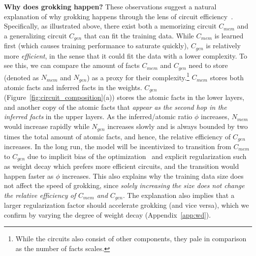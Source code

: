 \noindent\textbf{Why does grokking happen?} These observations suggest a natural explanation of why grokking happens through the lens of circuit efficiency~\citep{varma2023explaining}.
Specifically, as illustrated above, there exist both a memorizing circuit $C_{mem}$ and a generalizing circuit $C_{gen}$ that can fit the training data. While $C_{mem}$ is learned first (which causes training performance to saturate quickly), $C_{gen}$ is relatively more \textit{efficient}, in the sense that it could fit the data with a lower complexity.
To see this, we can compare the amount of facts $C_{mem}$ and $C_{gen}$ need to store (denoted as $N_{mem}$ and $N_{gen}$) as a proxy for their complexity.\footnote{While the circuits also consist of other components, they pale in comparison as the number of facts scales.}
$C_{mem}$ stores both atomic facts and inferred facts in the weights. $C_{gen}$ (Figure~\ref{fig:circuit_composition}(a)) stores the atomic facts in the lower layers, and another copy of the atomic facts that \textit{appear as the second hop in the inferred facts} in the upper layers. As the inferred/atomic ratio $\phi$ increases, $N_{mem}$ would increase rapidly while $N_{gen}$ increases slowly and is always bounded by two times the total amount of atomic facts, and hence, the relative efficiency of $C_{gen}$ increases. In the long run, the model will be incentivized to transition from $C_{mem}$ to $C_{gen}$ due to implicit bias of the optimization~\citep{soudry2018the} and explicit regularization such as weight decay which prefers more efficient circuits, and the transition would happen faster as $\phi$ increases. This also explains why the training data size does not affect the speed of grokking, since \textit{solely increasing the size does not change the relative efficiency of $C_{mem}$ and $C_{gen}$}. The explanation also implies that a larger regularization factor should accelerate grokking (and vice versa), which we confirm by varying the degree of weight decay (Appendix~\ref{app:wd}).

